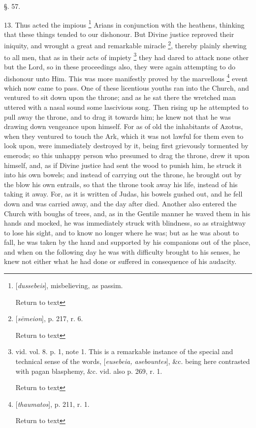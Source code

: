 §. 57.

13. Thus acted the impious \footnote{[\emph{dussebeis}], misbelieving, as passim.

Return to text} Arians in
conjunction with the heathens, thinking that these things tended to
our dishonour. But Divine justice reproved their iniquity, and wrought
a great and remarkable miracle \footnote{[\emph{s\={e}meion}], p. 217, r. 6.

Return to text}, thereby plainly shewing to
all men, that as in their acts of impiety \footnote{vid. vol. 8. p. 1, note 1. This is a
remarkable instance of the special and technical sense of the words, [\emph{eusebeia,
asebountes}], \&c. being here contrasted with pagan blasphemy,
\&c. vid. also p. 269, r. 1.

Return to text} they had dared to
attack none other but the Lord, so in these proceedings also, they
were again attempting to do dishonour unto Him. This was more
manifestly proved by the marvellous \footnote{[\emph{thaumatos}], p. 211, r. 1.

Return to text} event which now came to
pass. One of these licentious youths ran into the Church, and ventured
to sit down upon the throne; and as he sat there the wretched man
uttered with a nasal sound some lascivious song. Then rising up he
attempted to pull away the throne, and to drag it towards him; he knew
not that he was drawing down vengeance upon himself. For as of old the
inhabitants of Azotus, when they ventured to touch the Ark, which it
was not lawful for them even to look upon, were immediately destroyed
by it, being first grievously tormented by emerods; so this unhappy
person who presumed to drag the throne, drew it upon himself, and, as
if Divine justice had sent the wood to punish him, he struck it into
his own bowels; and instead of carrying out the throne, he brought out
by the blow his own entrails, so that the throne took away his life,
instead of his taking it away. For, as it is written of Judas, his
bowels gushed out, and he fell down and was carried away, and the day
after died. Another also entered the Church with boughs of trees, and,
as in the Gentile manner he waved them in his hands and mocked, he was
immediately struck with blindness, so as straightway to lose his
sight, and to know no longer where he was; but as he was about to
fall, he was taken by the hand and supported by his companions out of
the place, and when on the following day he was with difficulty
brought to his senses, he knew not either what he had done or suffered
in consequence of his audacity.

